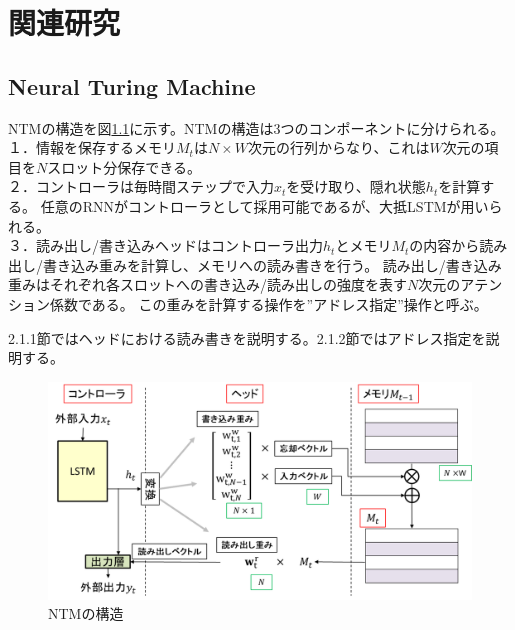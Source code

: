 \chapter{関連研究}

\section{Neural Turing Machine}
NTMの構造を図\ref{fig:ntm}に示す。NTMの構造は3つのコンポーネントに分けられる。
\\１．情報を保存するメモリ$M_t$は$N×W$次元の行列からなり、これは$W$次元の項目を$N$スロット分保存できる。
\\２．コントローラは毎時間ステップで入力$x_t$を受け取り、隠れ状態$h_t$を計算する。
任意のRNNがコントローラとして採用可能であるが、大抵LSTMが用いられる。
\\３．読み出し/書き込みヘッドはコントローラ出力$h_t$とメモリ$M_t$の内容から読み出し/書き込み重みを計算し、メモリへの読み書きを行う。
読み出し/書き込み重みはそれぞれ各スロットへの書き込み/読み出しの強度を表す$N$次元のアテンション係数である。
この重みを計算する操作を”アドレス指定”操作と呼ぶ。

2.1.1節ではヘッドにおける読み書きを説明する。2.1.2節ではアドレス指定を説明する。

\begin{figure}[t]
	\centering
	\includegraphics[width=\linewidth]{./figure/img_slide/ntm.png}
	\caption{NTMの構造}
	\label{fig:ntm}
\end{figure}

